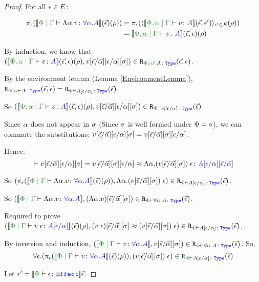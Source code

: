 \begin{proof}
    
    \case{\vgen}
    
    For all $\epsilon\in E$:
    
    \begin{align}
        \pe(\deno{\gpetyperelation{\elam{\a}{v}}{\all{\a}{A}}}\fundRho) & = \pe(\finpr{\deno{\etyperelation{\P,\a}{\G}{v}{A}}(\ev, \e')}{\e'\in E}(\rho)) 
        \\
        & = \deno{\etyperelation{\P,\a}{\G}{v}{A}}(\ev, \e)(\rho)
    \end{align}
    
    By induction, we know that $\inLogRel{\deno{\etyperelation{\P,\a}{\G}{v}{A}}(\ev, \e)(\rho)}{v\ssub{\av}{\ev}\ssub{\a}{\e}\ssi}{\P,\a}{A}{\ev, \e}$.
    
    
    By the environment lemma (Lemma \ref{EnvironmentLemma}), $\erelates{\P, \a}{A}(\ev, \e) = \erelates{\P}{A\ssub{\a}{\e}}(\ev)$.
    
    
    So $\inLogRelPE{\deno{\etyperelation{\P,\a}{\G}{v}{A}}(\ev, \e)(\rho)}{v\ssub{\av}{\ev}\ssub{\a}{\e}\ssi}{A\ssub{\a}{\e}}$
    
    Since $\alpha$ does not appear in $\sigma$ (Since $\sigma$ is well formed under $\Phi = \diamond$), we can commute the substitutions: $v[\vec{\epsilon} / \vec{\alpha}][\epsilon / \alpha][\sigma] = v[\vec{\epsilon} / \vec{\alpha}][\sigma][\epsilon / \alpha]$.
    
    Hence: 
    \begin{equation*}
        \zberelation{v\ssub{\av}{\ev}\ssub{\a}{\e}\ssi = v\ssub{\av}{\ev}\ssi\ssub{\a}{\e}}{\eapp{\elam{\a}{(v\fundSub)}}{\e}}{A\ssub{\a}{\e}\ssub{\av}{\ev}}
    \end{equation*}
    
    So $\inLogRelPE{    \pe(\deno{\gpetyperelation{\elam{\a}{v}}{\all{\a}{A}}}\fundRho)}{\eapp{\elam{\a}{(v\fundSub)}}{\e}}{A\ssub{\a}{\e}}$.
    
    So $\inLogRelPE{\deno{\gpetyperelation{\elam{\a}{v}}{\all{\a}{A}}}}{(\elam{\a}{v})\fundSub}{\all{\a}{A}}$.
    
    
    \case{\vspec}
    Required to prove $\inLogRelPE{\deno{\gpetyperelation{\eapp{v}{\e}}{A\ssub{\a}{\e}}}\fundRho}{(\eapp{v}{\e})\fundSub\beequiv\eapp{(v\fundSub)}{\e}}{A\ssub{\a}{\e}}$.
    
    By inversion and induction, $\inLogRelPE{\deno{\gpetyperelation{v}{\all{\a}{A}}}}{v\fundSub}{\all{\a}{A}}$. So, $$\forall\e. \inLogRelPE{\pe(\deno{\gpetyperelation{v}{\all{\a}{A}}}\fundRho)}{\eapp{(v\fundSub)}{\e}}{A\ssub{\a}{\e}}$$
    
    Let $\e' = \deno{\wellformede{\P}{\e}}\ev$.
    

\end{proof}
